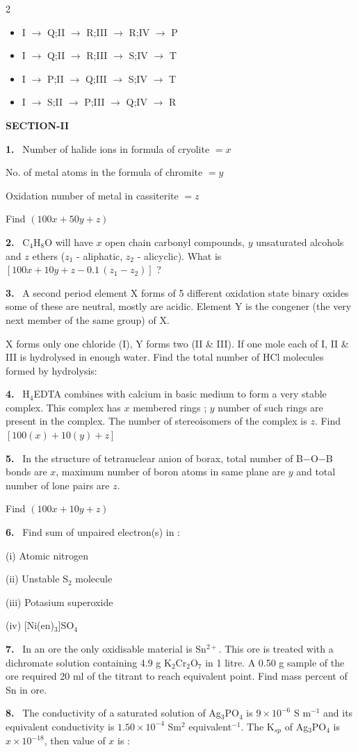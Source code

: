 \documentclass[10pt]{extarticle}
\newcommand{\sect}[1]{\par\smallskip\noindent\textbf{#1}\par}
\newcommand{\qn}[1]{\par\smallskip\noindent\textbf{#1.}~}
\newenvironment{qoptions}{\begin{itemize}[leftmargin=1.8em,itemsep=1pt,topsep=2pt,label={}]}{\end{itemize}}
\newcommand{\opt}[2]{\item[(#1)] #2}
\begin{document}
\begin{multicols}{2}
\begin{qoptions}
\opt{A}{I $\rightarrow$ Q;II $\rightarrow$ R;III $\rightarrow$ R;IV $\rightarrow$ P}
\opt{B}{I $\rightarrow$ Q;II $\rightarrow$ R;III $\rightarrow$ S;IV $\rightarrow$ T}
\opt{C}{I $\rightarrow$ P;II $\rightarrow$ Q;III $\rightarrow$ S;IV $\rightarrow$ T}
\opt{D}{I $\rightarrow$ S;II $\rightarrow$ P;III $\rightarrow$ Q;IV $\rightarrow$ R}
\end{qoptions}
\sect{SECTION-II}
\qn{1} Number of halide ions in formula of cryolite $=x$\par
No. of metal atoms in the formula of chromite $=y$\par
Oxidation number of metal in cassiterite $=z$\par
Find $(100x+50y+z)$
\qn{2} C$_4$H$_8$O will have $x$ open chain carbonyl compounds, $y$ unsaturated alcohols and $z$ ethers ($z_1$ - aliphatic, $z_2$ - alicyclic). What is $[100x+10y+z-0.1\,(z_1-z_2)]$ ?
\qn{3} A second period element X forms of 5 different oxidation state binary oxides some of these are neutral, mostly are acidic. Element Y is the congener (the very next member of the same group) of X.\par
X forms only one chloride (I), Y forms two (II \& III). If one mole each of I, II \& III is hydrolysed in enough water. Find the total number of HCl molecules formed by hydrolysis:
\qn{4} H$_4$EDTA combines with calcium in basic medium to form a very stable complex. This complex has $x$ membered rings ; $y$ number of such rings are present in the complex. The number of stereoisomers of the complex is $z$. Find $[100(x)+10(y)+z]$
\qn{5} In the structure of tetranuclear anion of borax, total number of B$-$O$-$B bonds are $x$, maximum number of boron atoms in same plane are $y$ and total number of lone pairs are $z$.\par
Find $(100x+10y+z)$
\qn{6} Find sum of unpaired electron(s) in :\par
(i) Atomic nitrogen\par
(ii) Unstable S$_2$ molecule\par
(iii) Potasium superoxide\par
(iv) [Ni(en)$_3$]SO$_4$
\qn{7} In an ore the only oxidisable material is Sn$^{2+}$. This ore is treated with a dichromate solution containing 4.9 g K$_2$Cr$_2$O$_7$ in 1 litre. A 0.50 g sample of the ore required 20 ml of the titrant to reach equivalent point. Find mass percent of Sn in ore.\par
[Atomic mass of Sn = 119, K = 39, Cr = 52]
\qn{8} The conductivity of a saturated solution of Ag$_3$PO$_4$ is $9\times10^{-6}$ S m$^{-1}$ and its equivalent conductivity is $1.50\times10^{-4}$ Sm$^2$ equivalent$^{-1}$. The K$_{sp}$ of Ag$_3$PO$_4$ is $x\times10^{-18}$, then value of $x$ is :

\end{multicols}
\end{document}
